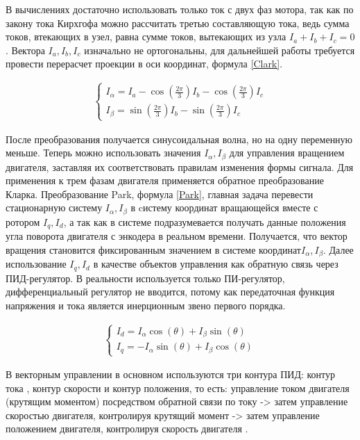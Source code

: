 В вычислениях достаточно использовать только ток с двух фаз мотора, так как по закону тока Кирхгофа можно рассчитать третью составляющую тока, ведь сумма токов, втекающих в узел, равна сумме токов, вытекающих из узла $I_a+I_b+I_c=0$. Вектора $I_a,I_b,I_c$ изначально не ортогональны, для дальнейшей работы требуется провести перерасчет проекции в оси координат, формула \ref{Clark}.
\begin{ceqn}
	\begin{align} \label{Clark}
		\begin{cases}
			I_{\alpha} = I_a - \cos\left(\frac{2\pi}{3}\right) I_b - \cos\left(\frac{2\pi}{3}\right) I_c \\
			I_{\beta} = \sin\left(\frac{2\pi}{3}\right) I_b - \sin\left(\frac{2\pi}{3}\right) I_c
		\end{cases}
	\end{align}
\end{ceqn}

После преобразования получается синусоидальная волна, но на одну переменную меньше. Теперь можно использовать значения $I_\alpha,I_\beta$ для управления вращением двигателя, заставляя их соответствовать правилам изменения формы сигнала. Для применения к трем фазам двигателя применяется обратное преобразование Кларка.
Преобразование Park, формула \ref{Park}, главная задача перевести стационарную систему $I_\alpha,I_\beta$ в cистему координат вращающейся вместе с ротором $I_q,I_d$, а так как в системе подразумевается получать данные положения угла поворота двигателя с энкодера в реальном времени. Получается, что вектор вращения становится фиксированным значением в системе координат$I_\alpha,I_\beta$.  Далее использование $I_q,I_d$ в качестве объектов управления как обратную связь через ПИД-регулятор. В реальности используется только ПИ-регулятор, дифференциальный регулятор не вводится, потому как передаточная функция напряжения и тока является инерционным звено первого порядка.

\begin{ceqn}
	\begin{align} \label{Park}
		\begin{cases}
			I_d = I_\alpha \cos(\theta) + I_\beta \sin(\theta) \\
			I_q = -I_\alpha \sin(\theta) + I_\beta \cos(\theta)
		\end{cases}
	\end{align}
\end{ceqn}


В векторным управлении в основном используются три контура ПИД: контур тока , контур скорости и контур положения, то есть: управление током двигателя (крутящим моментом) посредством обратной связи по току -> затем управление скоростью двигателя, контролируя крутящий момент -> затем управление положением двигателя, контролируя скорость двигателя . 